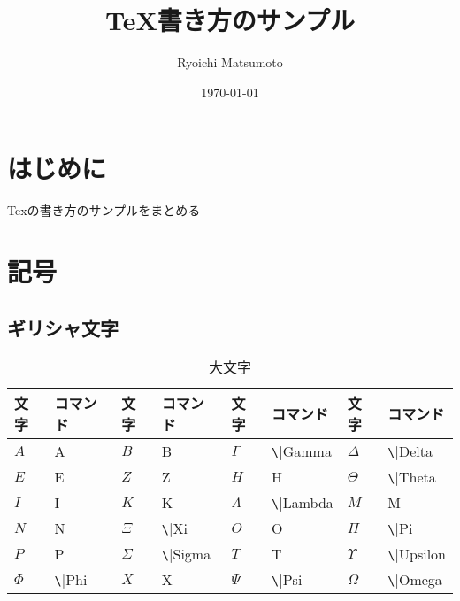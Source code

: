 \documentclass[11pt,a4paper]{jsarticle}
\title{TeX書き方のサンプル}
\author{Ryoichi Matsumoto}
\date{\today}
\begin{document}
\maketitle
%
%
\section{はじめに}
Texの書き方のサンプルをまとめる

\section{記号}

\subsection{ギリシャ文字}

\begin{table} [ h ]
\caption{大文字}
	\begin{center}
	\begin{tabular}{| l | l || l | l || l | l || l | l |} \hline
		文字 & コマンド & 文字 & コマンド & 文字 & コマンド & 文字 & コマンド \\ \hline
		$A$ & A & $B$ & B & $\Gamma$ & \verb|\|Gamma & $\Delta$ & \verb|\|Delta \\ \hline
		$E$ & E & $Z$ & Z & $H$ & H & $\Theta$ & \verb|\|Theta \\ \hline
		$I$ & I & $K$ & K & $\Lambda$ & \verb|\|Lambda & $M$ & M \\ \hline
		$N$ & N & $\Xi$ & \verb|\|Xi & $O$ & O & $\Pi$ & \verb|\|Pi \\ \hline
		$P$ & P & $\Sigma$ & \verb|\|Sigma & $T$ & T & $\Upsilon$ & \verb|\|Upsilon \\ \hline
		$\Phi$ & \verb|\|Phi & $X$ & X & $\Psi$ & \verb|\|Psi & $\Omega$ & \verb|\|Omega \\ \hline
	\end{tabular}
	\end{center}
\end{table}
\end{document}

